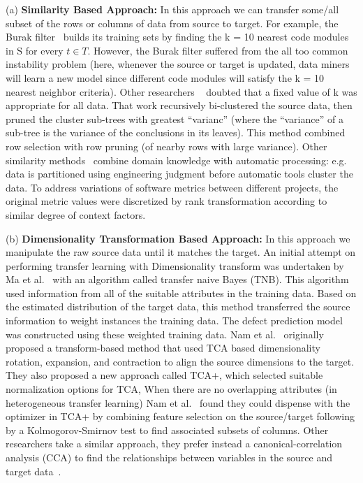 \documentclass[10pt,journal,compsoc]{IEEEtran}
\begin{document}
(a) \textbf{Similarity Based Approach:} In this approach we can transfer some/all subset of the rows or columns of data from source to target. For example, the Burak filter~\cite{turhan09} builds its training sets by finding the k = 10 nearest code modules in S for every $ t \in T $. However, the Burak filter suffered from the all too common instability problem (here, whenever the source or target is updated, data miners will learn a new model since different code modules will satisfy the k = 10 nearest neighbor criteria). Other researchers ~\cite{kocaguneli2012, kocaguneli2011find} doubted that a fixed value of k was appropriate for all data. That work recursively bi-clustered the source data, then pruned the cluster sub-trees with greatest ``varianc'' (where the ``variance'' of a sub-tree is the variance of the conclusions in its leaves). This method combined row selection with row pruning (of nearby rows with large variance). Other similarity methods~\cite{Zhang16aa} combine domain knowledge with automatic processing: e.g. data is partitioned using engineering judgment before automatic tools cluster the data. To address variations of software metrics between different projects, the original metric values were discretized by rank transformation according to similar degree of context factors.
    
(b) \textbf{Dimensionality Transformation Based Approach:} In this approach we manipulate the raw source data until it matches the target. An initial attempt on performing transfer learning with Dimensionality transform was undertaken by Ma et al.~\cite{Ma2012} with an algorithm called transfer naive Bayes (TNB). This algorithm used information from all of the suitable attributes in the training data. Based on the estimated distribution of the target data, this method transferred the source information to weight instances the training data. The defect prediction model was constructed using these weighted training data. Nam et al.~\cite{Nam13} originally proposed a transform-based method that used TCA based dimensionality rotation, expansion, and contraction to align the source dimensions to the target. They also proposed a new approach called TCA+, which selected suitable normalization options for TCA, When there are no overlapping attributes (in heterogeneous transfer learning) Nam et al.~\cite{Nam2015} found they could dispense with the optimizer in TCA+ by combining feature selection on the source/target following by a Kolmogorov-Smirnov test to find associated subsets of columns. Other researchers take a similar approach, they prefer instead a canonical-correlation analysis (CCA) to find the relationships between variables in the source and target data~\cite{jing2015heterogeneous}.
\end{document}
